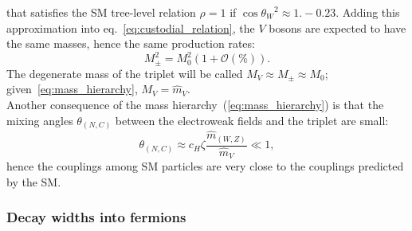 that satisfies the SM tree-level relation $\rho = 1$ if ${\cos{{\theta}_W}}^2 \approx 1. - 0.23$. Adding this approximation into eq.~\ref{eq:custodial_relation}, the $V$ bosons are expected to have the same masses, hence the same production rates:
\begin{equation}
M_{\pm}^2 = M_0^2 \left(1 + \mathcal{O}(\%) \right).
\label{eq:HVT_degeneracy}
\end{equation}
The degenerate mass of the triplet will be called $M_V \approx M_{\pm} \approx M_0$; given~\ref{eq:mass_hierarchy}, $M_V = \hat{m}_V$.
\\
Another consequence of the mass hierarchy~(\ref{eq:mass_hierarchy}) is that the mixing angles $\theta_{(N,C)}$ between the electroweak fields and the triplet are small:
\begin{equation}
{\theta}_{(N,C)} \approx c_H \zeta \frac{\hat{m}_{(W,Z)}}{ \hat{m}_V } \ll 1,
\label{eq:HVT_small_angles}
\end{equation}
hence the couplings among SM particles are very close to the couplings predicted by the SM.

\subsubsection{Decay widths into fermions}
\label{sec:HVT_decay_fermions}

